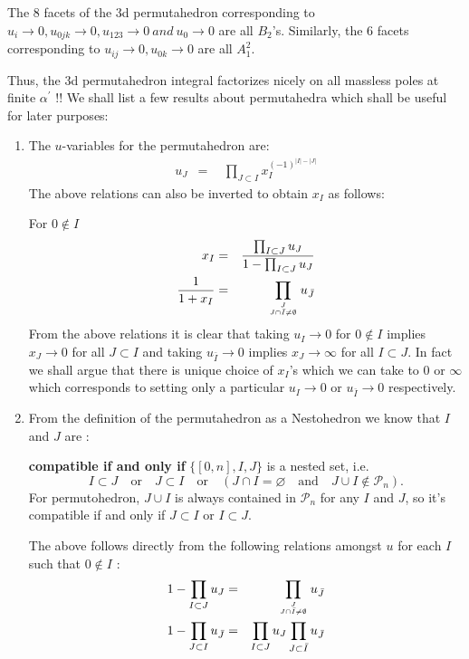 \documentclass[hidelinks,12pt]{article}
\newcommand{\bea}[1]{\begin{eqnarray}\label{#1} }
\newcommand{\eea}{\end{eqnarray}}
\def\bea{\begin{eqnarray}}
\def\eea{\end{eqnarray}}
\begin{document}
The 8 facets of the 3d permutahedron corresponding to $u_i \rightarrow 0, u_{0jk} \rightarrow 0,u_{123} \rightarrow 0 ~and ~u_{0} \rightarrow 0$  are all $B_2$'s. Similarly, the 6 facets corresponding to  $u_{ij} \rightarrow 0, u_{0k} \rightarrow 0$ are all  $A^{2}_1$.

Thus, the 3d permutahedron integral factorizes nicely on all massless poles at finite $\alpha^{'}$ !!
We shall list a few results about permutahedra which shall be useful for later purposes: 
\begin{enumerate}
\item The $u$-variables for the permutahedron are: 
\bea
u_J &=& ~~\prod_{J \subset I} x_I^{(-1)^{|I|-|J|}} \nonumber 
\eea
The above relations can also be inverted to obtain $x_I$ as follows:

For $0 \notin I $
\bea
x_I &=& \frac{\prod_{I \subset J} u_{J}}{1-\prod_{I \subset J} u_{J}} \\
\frac{1}{1+ x_I} &=& \prod_{{J}\atop{J\cap \bar{I} \ne \emptyset}} u_{\bar{J}}
\eea
From the above relations it is clear that taking $u_I \rightarrow 0$ for $0 \notin I$ implies $x_J \rightarrow 0$ for all $J \subset I$ and taking $u_{\bar{I}} \rightarrow 0$ implies $x_J \rightarrow \infty $ for all $I \subset J$.
In fact we shall argue that there is unique choice of $x_I$'s which we can take to $0$ or $\infty$ which corresponds to setting only a particular $u_I \rightarrow 0$ or $u_{\bar{I}} \rightarrow 0$ respectively.
\item From the definition of the permutahedron as a Nestohedron we know that $I$ and $J$ are :



{\bf compatible if and only if} $\{[0,n],I,J\}$ is a nested set, i.e.
\[
I\subset J\quad \text{or}\quad J\subset I\quad \text{or}\quad (J\cap I=\varnothing \quad \text{and}\quad J\cup I\not\in \mathscr P_n).
\]
For permutohedron, $J\cup I$ is always contained in $\mathscr P_n$ for any $I$ and $J$, so it's compatible if and only if $J\subset I$ or $I\subset J$.

The above  follows directly from the following relations amongst $u$ for each $I$ such that $0\notin I$ :
\bea
1-\prod_{I \subset J} u_{J} &=& \prod_{{J}\atop{J\cap \bar{I} \ne \emptyset}} u_{\bar{J}} \\
1-\prod_{J \subset I} u_{\bar{J}} &=& \prod_{I \subset J} u_{J} \prod_{J \subset \bar{I} } u_{\bar{J}}
\eea
\end{enumerate}
\end{document}
